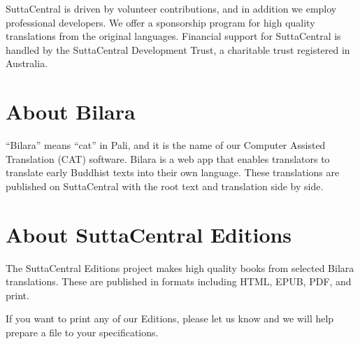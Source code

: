 \documentclass[12pt,openany]{book}%
\begin{document}
SuttaCentral is driven by volunteer contributions, and in addition we employ professional developers. We offer a sponsorship program for high quality translations from the original languages. Financial support for SuttaCentral is handled by the SuttaCentral Development Trust, a charitable trust registered in Australia.

\section*{About Bilara}

“Bilara” means “cat” in Pali, and it is the name of our Computer Assisted Translation (CAT) software. Bilara is a web app that enables translators to translate early Buddhist texts into their own language. These translations are published on SuttaCentral with the root text and translation side by side.

\section*{About SuttaCentral Editions}

The SuttaCentral Editions project makes high quality books from selected Bilara translations. These are published in formats including HTML, EPUB, PDF, and print.

If you want to print any of our Editions, please let us know and we will help prepare a file to your specifications.

%
\end{document}
